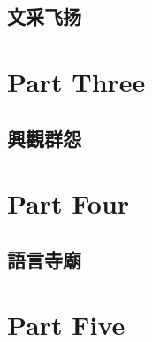 \documentclass[11pt,fleqn]{book} %
\begin{document}


\chapter{ 文采飞扬}




\part{Part Three}




\chapter{ 興觀群怨}













\part{Part Four}
\chapter{ 語言寺廟}

























\part{Part Five}
\end{document}
